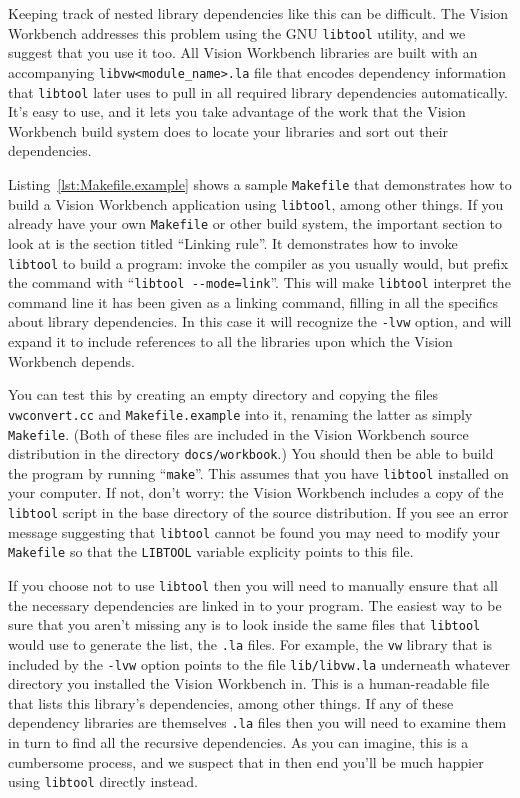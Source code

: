 Keeping track of nested library dependencies like this can be
difficult.  The Vision Workbench addresses this problem using the GNU
\verb#libtool# utility, and we suggest that you use it too.  All
Vision Workbench libraries are built with an accompanying
\verb#libvw<module_name>.la# file that encodes dependency information that
\verb#libtool# later uses to pull in all required library dependencies
automatically.  It's easy to use, and it lets you take advantage of
the work that the Vision Workbench build system does to locate your
libraries and sort out their dependencies.


Listing~\ref{lst:Makefile.example} shows a sample \verb#Makefile# 
that demonstrates how to build a Vision Workbench application using 
\verb#libtool#, among other things.  If you already have your own 
\verb#Makefile# or other build system, the important section to 
look at is the section titled ``Linking rule''.  It demonstrates 
how to invoke \verb#libtool# to build a program: invoke the compiler 
as you usually would, but prefix the command with 
``\verb#libtool --mode=link#''.  This will make \verb#libtool# 
interpret the command line it has been given as a linking command, 
filling in all the specifics about library dependencies.  In this 
case it will recognize the \verb#-lvw# option, and will expand it 
to include references to all the libraries upon which the Vision 
Workbench depends.

You can test this by creating an empty directory and copying the 
files \verb#vwconvert.cc# and \verb#Makefile.example# into it, 
renaming the latter as simply \verb#Makefile#.  (Both of these 
files are included in the Vision Workbench source distribution 
in the directory \verb#docs/workbook#.)  You should then 
be able to build the program by running ``\verb#make#''. 
This assumes that you have \verb#libtool# installed on your 
computer.  If not, don't worry: the Vision Workbench includes a 
copy of the \verb#libtool# script in the base directory of the 
source distribution.  If you see an error message suggesting that 
\verb#libtool# cannot be found you may need to modify your 
\verb#Makefile# so that the \verb#LIBTOOL# variable explicity 
points to this file.

If you choose not to use \verb#libtool# then you will need to manually
ensure that all the necessary dependencies are linked in to your
program.  The easiest way to be sure that you aren't missing any is to
look inside the same files that \verb#libtool# would use to generate
the list, the \verb#.la# files.  For example, the \verb#vw# library
that is included by the \verb#-lvw# option points to the file
\verb#lib/libvw.la# underneath whatever directory you installed the
Vision Workbench in.  This is a human-readable file that lists this
library's dependencies, among other things.  If any of these
dependency libraries are themselves \verb#.la# files then you will
need to examine them in turn to find all the recursive dependencies.
As you can imagine, this is a cumbersome process, and we suspect that
in then end you'll be much happier using \verb#libtool# directly
instead.

